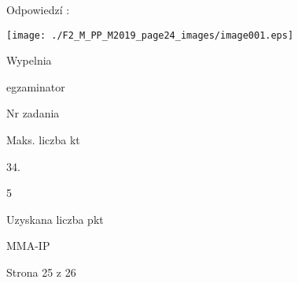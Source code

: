 \documentclass[a4paper,12pt]{article}
\begin{document}
Odpowiedzí :
\begin{center}
\texttt{[image: ./F2\_M\_PP\_M2019\_page24\_images/image001.eps]}
\end{center}
Wypelnia

egzaminator

Nr zadania

Maks. liczba kt

34.

5

Uzyskana liczba pkt

MMA-IP

Strona 25 z 26
\end{document}
